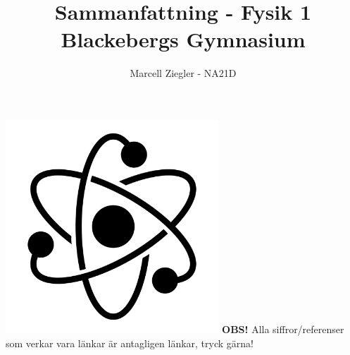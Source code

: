 \documentclass{article}
\title{Sammanfattning - Fysik 1 \\ Blackebergs Gymnasium}
\author{Marcell Ziegler - NA21D}
\begin{document}
    \begin{titlepage}
        \maketitle
        \centering
        \vfill
        \includegraphics[width=0.6\textwidth]{title.jpg}
        \vfill
        \textbf{OBS!} Alla siffror/referenser som verkar vara länkar är antagligen länkar, tryck gärna!
    \end{titlepage}

    \tableofcontents

    \newpage
\end{document}
